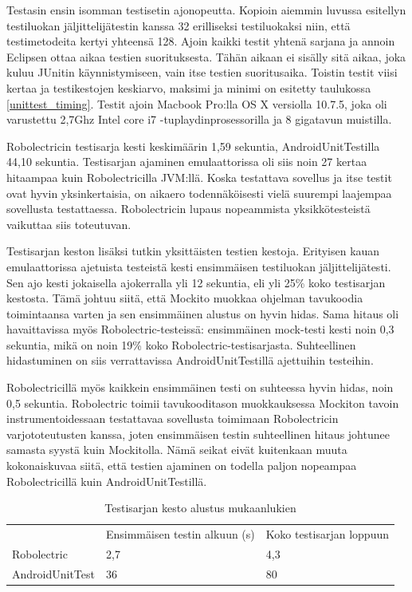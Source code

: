 Testasin ensin isomman testisetin ajonopeutta. Kopioin aiemmin luvussa esitellyn testiluokan jäljittelijätestin kanssa 32 erilliseksi testiluokaksi niin, että testimetodeita kertyi yhteensä 128. Ajoin kaikki testit yhtenä sarjana ja annoin Eclipsen ottaa aikaa testien suorituksesta. Tähän aikaan ei sisälly sitä aikaa, joka kuluu JUnitin käynnistymiseen, vain itse testien suoritusaika. Toistin testit viisi kertaa ja testikestojen keskiarvo, maksimi ja minimi on esitetty taulukossa \ref{unittest_timing}. Testit ajoin Macbook Pro:lla OS X versiolla 10.7.5, joka oli varustettu 2,7Ghz Intel core i7 -tuplaydinprosessorilla ja 8 gigatavun muistilla.

Robolectricin testisarja kesti keskimäärin 1,59 sekuntia, AndroidUnitTestilla 44,10 sekuntia. Testisarjan ajaminen emulaattorissa oli siis noin 27 kertaa hitaampaa kuin Robolectricilla JVM:llä. Koska testattava sovellus ja itse testit ovat hyvin yksinkertaisia, on aikaero todennäköisesti vielä suurempi laajempaa sovellusta testattaessa. Robolectricin lupaus nopeammista yksikkötesteistä vaikuttaa siis toteutuvan.

Testisarjan keston lisäksi tutkin yksittäisten testien kestoja. Erityisen kauan emulaattorissa ajetuista testeistä kesti ensimmäisen testiluokan jäljittelijätesti. Sen ajo kesti jokaisella ajokerralla yli 12 sekuntia, eli yli 25\% koko testisarjan kestosta. Tämä johtuu siitä, että Mockito muokkaa ohjelman tavukoodia toimintaansa varten ja sen ensimmäinen alustus on hyvin hidas. Sama hitaus oli havaittavissa myös Robolectric-testeissä: ensimmäinen mock-testi kesti noin 0,3 sekuntia, mikä on noin 19\% koko Robolectric-testisarjasta. Suhteellinen hidastuminen on siis verrattavissa AndroidUnitTestillä ajettuihin testeihin.

Robolectricillä myös kaikkein ensimmäinen testi on suhteessa hyvin hidas, noin 0,5 sekuntia. Robolectric toimii tavukooditason muokkauksessa Mockiton tavoin instrumentoidessaan testattavaa sovellusta toimimaan Robolectricin varjototeutusten kanssa, joten ensimmäisen testin suhteellinen hitaus johtunee samasta syystä kuin Mockitolla.
Nämä seikat eivät kuitenkaan muuta kokonaiskuvaa siitä, että testien ajaminen on todella paljon nopeampaa Robolectricillä kuin AndroidUnitTestillä.

\begin{table}[h]
\centering
\begin{tabular}{ l l l }
   & Ensimmäisen testin alkuun (s) & Koko testisarjan loppuun \\
  Robolectric & 2,7 & 4,3 \\
  AndroidUnitTest & 36 & 80 \\
\end{tabular}
\caption{Testisarjan kesto alustus mukaanlukien}
\label{unittest_startup}
\end{table}

